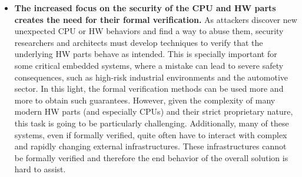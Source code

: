 \begin{itemize}
		\item \textbf{The increased focus on the security of the CPU and HW parts creates the need for their formal verification.} As attackers discover new unexpected CPU or HW behaviors and find a way to abuse them, security researchers and architects must develop techniques to verify that the underlying HW parts behave as intended. This is specially important for some critical embedded systems, where a mistake can lead to severe safety consequences, such as high-risk industrial environments and the automotive sector. In this light, the formal verification methods can be used more and more to obtain such guarantees. However, given the complexity of many modern HW parts (and especially CPUs) and their strict proprietary nature, this task is going to be particularly challenging. Additionally, many of these systems, even if formally verified, quite often have to interact with complex and rapidly changing external infrastructures. These infrastructures cannot be formally verified and therefore the end behavior of the overall solution is hard to assist.  	
		\end{itemize}
		
		
